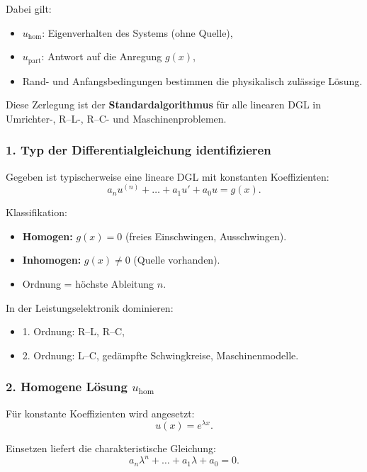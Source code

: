 Dabei gilt:
\begin{itemize}
    \item $u_{\mathrm{hom}}$: Eigenverhalten des Systems (ohne Quelle),
    \item $u_{\mathrm{part}}$: Antwort auf die Anregung $g(x)$,
    \item Rand- und Anfangsbedingungen bestimmen die physikalisch zulässige Lösung.
\end{itemize}

Diese Zerlegung ist der \textbf{Standardalgorithmus} für alle linearen DGL in Umrichter-, R--L-, R--C- und Maschinenproblemen.


\subsubsection{1. Typ der Differentialgleichung identifizieren}

Gegeben ist typischerweise eine lineare DGL mit konstanten Koeffizienten:
\[
a_n u^{(n)} + \dots + a_1 u' + a_0 u = g(x).
\]

Klassifikation:
\begin{itemize}
    \item \textbf{Homogen:} $g(x) = 0$ (freies Einschwingen, Ausschwingen).
    \item \textbf{Inhomogen:} $g(x) \neq 0$ (Quelle vorhanden).
    \item Ordnung = höchste Ableitung $n$.
\end{itemize}

In der Leistungselektronik dominieren:
\begin{itemize}
    \item 1. Ordnung: R--L, R--C,
    \item 2. Ordnung: L--C, gedämpfte Schwingkreise, Maschinenmodelle.
\end{itemize}


\subsubsection{2. Homogene Lösung $u_{\mathrm{hom}}$}

Für konstante Koeffizienten wird angesetzt:
\[
u(x) = e^{\lambda x}.
\]

Einsetzen liefert die charakteristische Gleichung:
\[
a_n \lambda^n + \dots + a_1 \lambda + a_0 = 0.
\]

